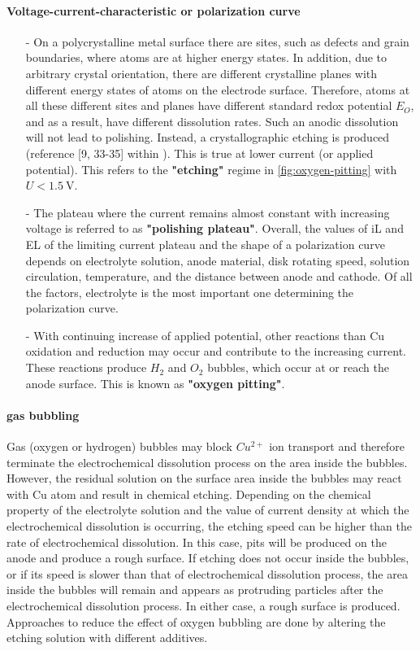 \paragraph{Voltage-current-characteristic or polarization curve}
\begin{itemize}
	\item[-]On a polycrystalline metal surface there are sites, such as defects and grain boundaries, where atoms are at higher energy states. In addition, due to arbitrary crystal orientation, there are different crystalline planes with different energy states of atoms on the electrode surface. Therefore, atoms at all these different sites and planes have different standard redox potential $E_O$, and as a result, have different dissolution rates.
	Such an anodic dissolution will not lead to polishing. Instead, a crystallographic etching is produced (reference [9, 33-35] within \cite{jinshan_electrochemical_2004}). This is true at lower current (or applied potential). This refers to the \textbf{"etching"} regime in \autoref{fig:oxygen-pitting} with $U<\SI{1.5}{\volt}$.
	\item[-]The plateau where the current remains almost constant with increasing voltage is referred to as \textbf{"polishing plateau"}. Overall, the values of iL and EL of the limiting current plateau and the shape of a polarization curve depends on electrolyte solution, anode material, disk rotating speed, solution circulation, temperature, and the distance between anode and cathode.
	Of all the factors, electrolyte is the most important one determining the polarization curve.
	\item[-]With continuing increase of applied potential, other reactions than Cu oxidation and reduction may occur and contribute to the increasing current. These reactions produce $H_2$ and $O_2$ bubbles, which occur at or reach the anode surface. This is known as \textbf{"oxygen pitting"}.
\end{itemize}

\paragraph{gas bubbling}
Gas (oxygen or hydrogen) bubbles may block $Cu^{2+}$ ion transport and therefore terminate the electrochemical dissolution process on the area inside the bubbles. However, the residual solution on the surface area inside the bubbles may react with Cu atom and result in chemical etching. Depending on the chemical property of the electrolyte solution and the value of current density at which the electrochemical dissolution is occurring, the etching speed can be higher than the rate of electrochemical dissolution. In this case, pits will be produced on the anode and produce a rough surface. If etching does not occur inside the bubbles, or if its speed is slower than that of electrochemical dissolution process, the area inside the bubbles will remain and appears as protruding particles after the electrochemical dissolution process. In either case, a rough surface is produced. Approaches to reduce the effect of oxygen bubbling are done by altering the etching solution with different additives.


